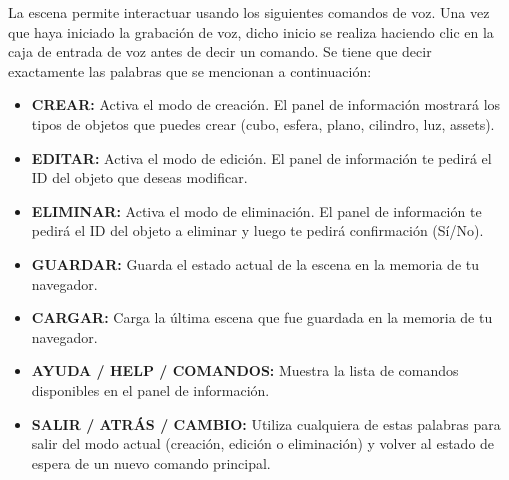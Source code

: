 \documentclass[a4paper, 12pt]{book}
\begin{document}
La escena permite interactuar usando los siguientes comandos de voz. 
Una vez que haya iniciado la grabación de voz, dicho inicio se realiza haciendo clic en la caja de entrada de voz antes de decir un comando.
Se tiene que decir exactamente las palabras que se mencionan a continuación: 
\begin{itemize}
  \setlength\itemsep{0.3em}
\setlength\parskip{0pt}  
  \item \textbf{CREAR:} Activa el modo de creación. El panel de información mostrará los tipos de objetos que puedes crear (cubo, esfera, plano, cilindro, luz, assets).
  \item \textbf{EDITAR:} Activa el modo de edición. El panel de información te pedirá el ID del objeto que deseas modificar.
  \item \textbf{ELIMINAR:} Activa el modo de eliminación. El panel de información te pedirá el ID del objeto a eliminar y luego te pedirá confirmación (Sí/No).
  \item \textbf{GUARDAR:} Guarda el estado actual de la escena en la memoria de tu navegador.
  \item \textbf{CARGAR:} Carga la última escena que fue guardada en la memoria de tu navegador.
  \item \textbf{AYUDA / HELP / COMANDOS:} Muestra la lista de comandos disponibles en el panel de información.
  \item \textbf{SALIR / ATRÁS / CAMBIO:} Utiliza cualquiera de estas palabras para salir del modo actual (creación, edición o eliminación) y volver al estado de espera de un nuevo comando principal.
\end{itemize}
\end{document}
